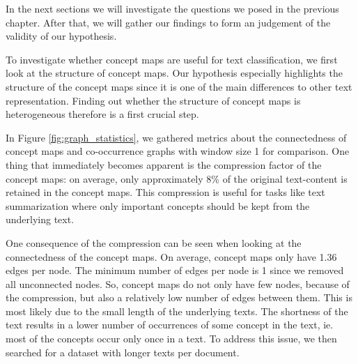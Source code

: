 In the next sections we will investigate the questions we posed in the previous chapter.
After that, we will gather our findings to form an judgement of the validity of our hypothesis.


To investigate whether concept maps are useful for text classification, we first look at the structure of concept maps.
Our hypothesis especially highlights the structure of the concept maps since it is one of the main differences to other text representation.
Finding out whether the structure of concept maps is heterogeneous therefore is a first crucial step.

In Figure \ref{fig:graph_statistics}, we gathered metrics about the connectedness of concept maps and co-occurrence graphs with window size 1 for comparison.
One thing that immediately becomes apparent is the compression factor of the concept maps: on average, only approximately 8\% of the original text-content is retained in the concept maps.
This compression is useful for tasks like text summarization where only important concepts should be kept from the underlying text.

One consequence of the compression can be seen when looking at the connectedness of the concept maps.
On average, concept maps only have 1.36 edges per node. The minimum number of edges per node is 1 since we removed all unconnected nodes.
So, concept maps do not only have few nodes, because of the compression, but also a relatively low number of edges between them.
This is most likely due to the small length of the underlying texts.
The shortness of the text results in a lower number of occurrences of some concept in the text, ie. most of the concepts occur only once in a text.
To address this issue, we then searched for a dataset with longer texts per document.


